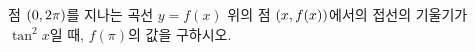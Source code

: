 점 $(0{,}\mkern3mu\mathopen{}2\pi)$를 지나는 곡선 $y=f(x)$ 위의 점 $(x{,}\mkern3mu\mathopen{}f(x))$에서의 접선의 기울기가 $\tan^2 x$일 때, $f(\pi)$의 값을 구하시오.
